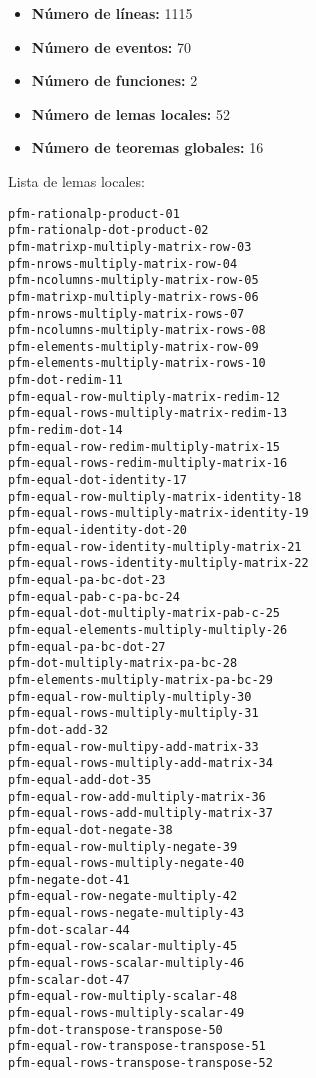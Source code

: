 \documentclass[a4paper,10pt]{article}
\begin{document}
\begin{itemize}
	\item \textbf{Número de líneas:} 1115
	\item \textbf{Número de eventos:} 70
	\item \textbf{Número de funciones:} 2
	\item \textbf{Número de lemas locales:} 52
	\item \textbf{Número de teoremas globales:} 16
\end{itemize}

\par \vspace{10pt}

Lista de lemas locales:

\par \vspace{10pt}

\begin{lstlisting}[language=clips]
pfm-rationalp-product-01
pfm-rationalp-dot-product-02
pfm-matrixp-multiply-matrix-row-03
pfm-nrows-multiply-matrix-row-04
pfm-ncolumns-multiply-matrix-row-05
pfm-matrixp-multiply-matrix-rows-06
pfm-nrows-multiply-matrix-rows-07 
pfm-ncolumns-multiply-matrix-rows-08
pfm-elements-multiply-matrix-row-09
pfm-elements-multiply-matrix-rows-10
pfm-dot-redim-11
pfm-equal-row-multiply-matrix-redim-12
pfm-equal-rows-multiply-matrix-redim-13
pfm-redim-dot-14
pfm-equal-row-redim-multiply-matrix-15
pfm-equal-rows-redim-multiply-matrix-16
pfm-equal-dot-identity-17
pfm-equal-row-multiply-matrix-identity-18
pfm-equal-rows-multiply-matrix-identity-19
pfm-equal-identity-dot-20
pfm-equal-row-identity-multiply-matrix-21
pfm-equal-rows-identity-multiply-matrix-22
pfm-equal-pa-bc-dot-23
pfm-equal-pab-c-pa-bc-24
pfm-equal-dot-multiply-matrix-pab-c-25
pfm-equal-elements-multiply-multiply-26
pfm-equal-pa-bc-dot-27
pfm-dot-multiply-matrix-pa-bc-28
pfm-elements-multiply-matrix-pa-bc-29
pfm-equal-row-multiply-multiply-30
pfm-equal-rows-multiply-multiply-31
pfm-dot-add-32
pfm-equal-row-multipy-add-matrix-33
pfm-equal-rows-multiply-add-matrix-34  
pfm-equal-add-dot-35
pfm-equal-row-add-multiply-matrix-36
pfm-equal-rows-add-multiply-matrix-37
pfm-equal-dot-negate-38
pfm-equal-row-multiply-negate-39
pfm-equal-rows-multiply-negate-40
pfm-negate-dot-41
pfm-equal-row-negate-multiply-42
pfm-equal-rows-negate-multiply-43
pfm-dot-scalar-44
pfm-equal-row-scalar-multiply-45
pfm-equal-rows-scalar-multiply-46
pfm-scalar-dot-47
pfm-equal-row-multiply-scalar-48
pfm-equal-rows-multiply-scalar-49
pfm-dot-transpose-transpose-50
pfm-equal-row-transpose-transpose-51
pfm-equal-rows-transpose-transpose-52
\end{lstlisting}
\end{document}
